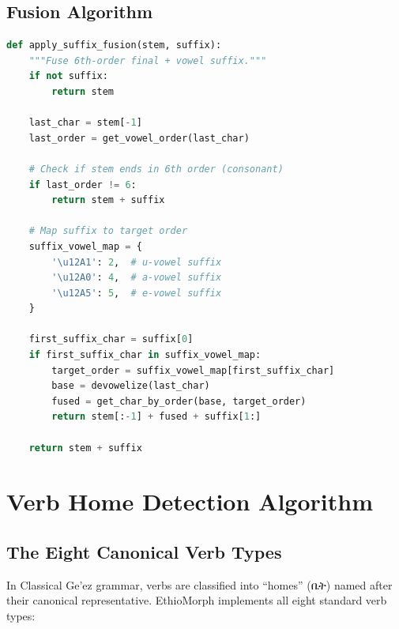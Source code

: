 \documentclass[conference]{IEEEtran}
\newcommand{\geez}[1]{{\ethiopicfont #1}}
\begin{document}
\subsection{Fusion Algorithm}

\begin{lstlisting}[language=Python]
def apply_suffix_fusion(stem, suffix):
    """Fuse 6th-order final + vowel suffix."""
    if not suffix:
        return stem
    
    last_char = stem[-1]
    last_order = get_vowel_order(last_char)
    
    # Check if stem ends in 6th order (consonant)
    if last_order != 6:
        return stem + suffix
    
    # Map suffix to target order
    suffix_vowel_map = {
        '\u12A1': 2,  # u-vowel suffix
        '\u12A0': 4,  # a-vowel suffix  
        '\u12A5': 5,  # e-vowel suffix
    }
    
    first_suffix_char = suffix[0]
    if first_suffix_char in suffix_vowel_map:
        target_order = suffix_vowel_map[first_suffix_char]
        base = devowelize(last_char)
        fused = get_char_by_order(base, target_order)
        return stem[:-1] + fused + suffix[1:]
    
    return stem + suffix
\end{lstlisting}

\section{Verb Home Detection Algorithm}

\subsection{The Eight Canonical Verb Types}

In Classical Ge'ez grammar, verbs are classified into ``homes'' (\geez{ቤት}) named after their canonical representative. EthioMorph implements all eight standard verb types:
\end{document}
